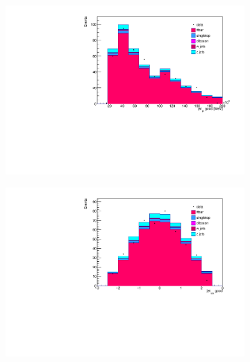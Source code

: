 \begin{figure}
  \begin{subfigure}{0.5\textwidth}
    \centering
    \includegraphics[width=\linewidth]{plots_and_txt/stacked_plots/stacked_jet_pt_good.pdf}
    \caption{}
    \label{fig:stacked_lep_pt3}
  \end{subfigure}%
  \begin{subfigure}{0.5\textwidth}
    \centering
    \includegraphics[width=\linewidth]{plots_and_txt/stacked_plots/stacked_jet_eta_good.pdf}
    \caption{}
    \label{fig:stacked_btagged3}
  \end{subfigure}%
  \newline
  \begin{subfigure}{0.5\textwidth}
    \centering

\end{subfigure}
\end{figure}
